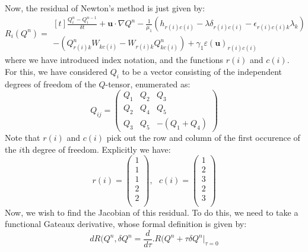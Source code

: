 \documentclass[reqno]{article}
\begin{document}
  Now, the residual of Newton's method is just given by:
  \begin{equation}
    R_i(Q^n)
    =
    \begin{multlined}[t]
    \frac{Q_i^n - Q_i^{n - 1}}{\delta t}
    + \mathbf{u} \cdot \nabla Q^n
    -
    \frac{1}{\mu_1} \left( h_{r(i)c(i)} - \lambda \delta_{r(i)c(i)} - \epsilon_{r(i)c(i)k} \lambda_k \right) \\
    - \left( Q^n_{r(i)k} W_{kc(i)} - W_{r(i)k} Q_{kc(i)}^n \right)
    + \gamma_1 \varepsilon(\mathbf{u})_{r(i)c(i)}
    \end{multlined}
  \end{equation}
  where we have introduced index notation, and the functions $r(i)$ and $c(i)$.
  For this, we have considered $Q_i$ to be a vector consisting of the
  independent degrees of freedom of the $Q$-tensor, enumerated as:
  \begin{equation}
    Q_{ij}
    =
    \begin{pmatrix}
      Q_1 &Q_2 &Q_3 \\
      Q_2 &Q_4 &Q_5 \\
      Q_3 &Q_5 &-(Q_1 + Q_4)
    \end{pmatrix}
  \end{equation}
  Note that $r(i)$ and $c(i)$ pick out the row and column of the first occurence
  of the $i$th degree of freedom.
  Explicitly we have:
  \begin{equation}
    r(i)
    =
    \begin{pmatrix}
      1 \\
      1 \\
      1 \\
      2 \\
      2 \\
    \end{pmatrix}
    ,
    \:\:\:
    c(i)
    =
    \begin{pmatrix}
      1 \\
      2 \\
      3 \\
      2 \\
      3 \\
    \end{pmatrix}
  \end{equation}
  Now, we wish to find the Jacobian of this residual.
  To do this, we need to take a functional Gateaux derivative, whose formal
  definition is given by:
  \begin{equation}
    dR(Q^n, \delta Q^n
    =
    \frac{d}{d\tau}
    \bigl. R(Q^n + \tau \delta Q^n \bigr|_{\tau = 0 }
  \end{equation}
\end{document}
